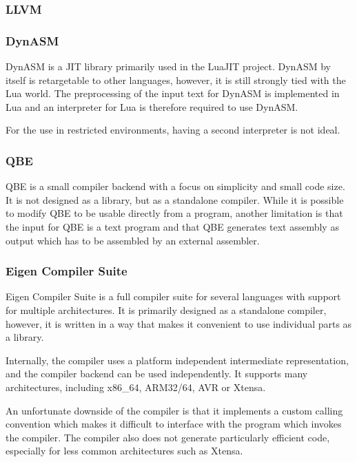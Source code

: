 \subsubsection{LLVM}



\subsubsection{DynASM}

DynASM is a JIT library primarily used in the LuaJIT project\cite{dynasm}. DynASM by itself is retargetable to other languages, however, it is still strongly tied with the Lua world. The preprocessing of the input text for DynASM is implemented in Lua and an interpreter for Lua is therefore required to use DynASM.

For the use in restricted environments, having a second interpreter is not ideal.


\subsubsection{QBE}

QBE is a small compiler backend with a focus on simplicity and small code size\cite{qbe}. It is not designed as a library, but as a standalone compiler. While it is possible to modify QBE to be usable directly from a program, another limitation is that the input for QBE is a text program and that QBE generates text assembly as output which has to be assembled by an external assembler.


\subsubsection{Eigen Compiler Suite}

Eigen Compiler Suite is a full compiler suite for several languages with support for multiple architectures\cite{ecs}. It is primarily designed as a standalone compiler, however, it is written in a way that makes it convenient to use individual parts as a library.

Internally, the compiler uses a platform independent intermediate representation, and the compiler backend can be used independently. It supports many architectures, including x86\_64, ARM32/64, AVR or Xtensa.

An unfortunate downside of the compiler is that it implements a custom calling convention which makes it difficult to interface with the program which invokes the compiler. The compiler also does not generate particularly efficient code, especially for less common architectures such as Xtensa.
